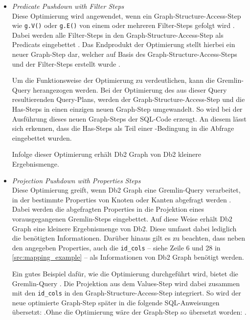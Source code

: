 \begin{itemize}
    \item \textit{Predicate Pushdown with Filter Steps}\\
    Diese Optimierung wird angewendet, wenn ein Graph-Structure-Access-Step wie \texttt{g.V()} oder \texttt{g.E()} von einem oder mehreren Filter-Steps gefolgt wird \cite{sigmod_tian}. Dabei werden alle Filter-Steps in den Graph-Structure-Access-Step als Predicats eingebettet \cite{sigmod_tian}. Das Endprodukt der Optimierung stellt hierbei ein neuer Graph-Step dar, welcher auf Basis des Graph-Structure-Access-Steps und der Filter-Steps erstellt wurde \cite{sigmod_tian}. 
    
    Um die Funktionsweise der Optimierung zu verdeutlichen, kann die Gremlin-Query  herangezogen werden. Bei der Optimierung des aus dieser Query resultierenden Query-Plans, werden der Graph-Structure-Access-Step und die Has-Steps in einen einzigen neuen Graph-Step umgewandelt. So wird bei der Ausführung dieses neuen Graph-Steps der SQL-Code  erzeugt. An diesem lässt sich erkennen, dass die Has-Steps als Teil einer -Bedingung in die Abfrage eingebettet wurden.

    Infolge dieser Optimierung erhält Db2 Graph von Db2 kleinere Ergebnismenge.

    \item \textit{Projection Pushdown with Properties Steps}\\
    Diese Optimierung greift, wenn Db2 Graph eine Gremlin-Query verarbeitet, in der bestimmte Properties von Knoten oder Kanten abgefragt werden \cite{sigmod_tian}. Dabei werden die abgefragten Properties in die Projektion eines vorausgegangenen Gremlin-Steps eingebettet. Auf diese Weise erhält Db2 Graph eine kleinere Ergebnismenge von Db2. Diese umfasst dabei lediglich die benötigten Informationen. Darüber hinaus gilt es zu beachten, dass neben den angegeben Properties, auch die \texttt{id\_cols} -- siehe Zeile 6 und 28 in \autoref{src:mapping_example} -- als Informationen von Db2 Graph benötigt werden. 

    Ein gutes Beispiel dafür, wie die Optimierung durchgeführt wird, bietet die Gremlin-Query . Die Projektion aus dem Values-Step wird dabei zusammen mit den \texttt{id\_cols} in den Graph-Structure-Access-Step integriert. So wird der neue optimierte Graph-Step später in die folgende SQL-Anweisungen übersetzt: .Ohne die Optimierung wäre der Graph-Step so übersetzt worden: .


\end{itemize}
